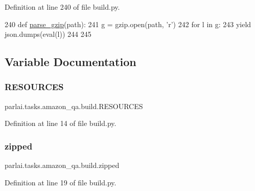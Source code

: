 Definition at line 240 of file build.\+py.


\begin{DoxyCode}
240 \textcolor{keyword}{def }\hyperlink{namespaceparlai_1_1tasks_1_1amazon__qa_1_1build_a4dc970e3684ff021439ed7e158c4da35}{parse\_gzip}(path):
241     g = gzip.open(path, \textcolor{stringliteral}{'r')}
242 \textcolor{stringliteral}{    }\textcolor{keywordflow}{for} l \textcolor{keywordflow}{in} g:
243         \textcolor{keywordflow}{yield} json.dumps(eval(l))
244 
245 
\end{DoxyCode}


\subsection{Variable Documentation}
\mbox{\label{namespaceparlai_1_1tasks_1_1amazon__qa_1_1build_a59f5bdb6195436f1309146ea17e7ff07}} 
\subsubsection{\texorpdfstring{R\+E\+S\+O\+U\+R\+C\+ES}{RESOURCES}}
{\footnotesize\ttfamily parlai.\+tasks.\+amazon\+\_\+qa.\+build.\+R\+E\+S\+O\+U\+R\+C\+ES}



Definition at line 14 of file build.\+py.

\mbox{\label{namespaceparlai_1_1tasks_1_1amazon__qa_1_1build_a5579717834de5ddc11ed13cd425e8cbe}} 
\subsubsection{\texorpdfstring{zipped}{zipped}}
{\footnotesize\ttfamily parlai.\+tasks.\+amazon\+\_\+qa.\+build.\+zipped}



Definition at line 19 of file build.\+py.

